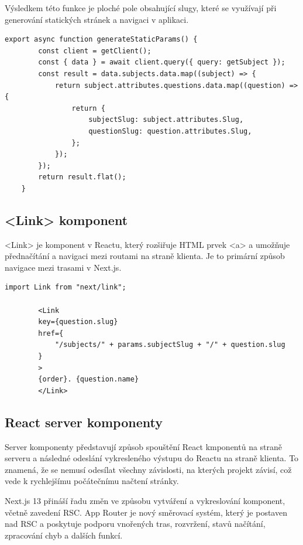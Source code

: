 \documentclass[12pt, a4paper,
oneside,      %
openright
]{report}
\begin{document}
Výsledkem této funkce je ploché pole obsahující slugy, které se využívají při generování statických stránek a navigaci v aplikaci.

\vspace{10pt}

\begin{lstlisting}[style=JavaScript, title={Kód}, caption={Ukázka funkce generateStaticParams v page.js}]
	export async function generateStaticParams() {
		const client = getClient();
		const { data } = await client.query({ query: getSubject });
		const result = data.subjects.data.map((subject) => {
			return subject.attributes.questions.data.map((question) => {
				return {
					subjectSlug: subject.attributes.Slug,
					questionSlug: question.attributes.Slug,
				};
			});
		});
		return result.flat();
	}
\end{lstlisting}	

\subsection{<Link> komponent}
<Link> je komponent v Reactu, který rozšiřuje HTML prvek <a> a umožňuje přednačítání a navigaci mezi routami na straně klienta. Je to primární způsob navigace mezi trasami v Next.js.

\vspace{10pt}

\begin{lstlisting}[style=JavaScript, title={Kód}, caption={Ukázka next/link v layout.js}] 
	import Link from "next/link";
	
		<Link
		key={question.slug}
		href={
			"/subjects/" + params.subjectSlug + "/" + question.slug
		}
		>
		{order}. {question.name}
		</Link>
\end{lstlisting}	

\subsection{React server komponenty}
Server komponenty představují způsob spouštění React kmponentů na straně serveru a následné odeslání vykresleného výstupu do Reactu na straně klienta. To znamená, že se nemusí odesílat všechny závislosti, na kterých projekt závisí, což vede k rychlejšímu počátečnímu načtení stránky.

Next.js 13 přináší řadu změn ve způsobu vytváření a vykreslování komponent, včetně zavedení RSC. App Router je nový směrovací systém, který je postaven nad RSC a poskytuje podporu vnořených tras, rozvržení, stavů načítání, zpracování chyb a dalších funkcí.
\end{document}

